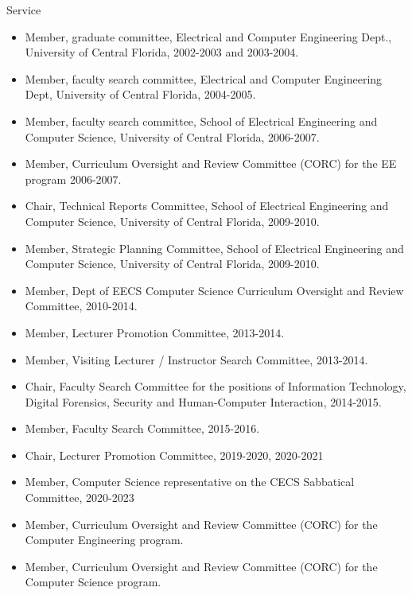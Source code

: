 \begin{category}{Service}
\begin{itemize}
\item Member, graduate committee, Electrical and Computer Engineering Dept., University of Central Florida, 2002-2003 and 2003-2004.

\item Member, faculty search committee, Electrical and Computer Engineering Dept, University of Central Florida, 2004-2005.

\item Member, faculty search committee, School of Electrical Engineering and Computer Science, University of Central Florida, 2006-2007.

\item Member, Curriculum Oversight and Review Committee (CORC) for the EE
program 2006-2007.

\item Chair, Technical Reports Committee, School of Electrical Engineering and Computer Science, University of Central Florida, 2009-2010.

\item Member, Strategic Planning Committee, School of Electrical Engineering and Computer Science, University of Central Florida, 2009-2010.

\item Member, Dept of EECS Computer Science Curriculum Oversight and Review Committee, 2010-2014.

\item Member, Lecturer Promotion Committee, 2013-2014.

\item Member, Visiting Lecturer / Instructor Search Committee, 2013-2014.

\item Chair, Faculty Search Committee for the positions of Information Technology, Digital Forensics, Security and Human-Computer Interaction, 2014-2015.

\item Member, Faculty Search Committee, 2015-2016.

\item Chair, Lecturer Promotion Committee, 2019-2020, 2020-2021

\item Member, Computer Science representative on the CECS Sabbatical Committee, 2020-2023

\item Member, Curriculum Oversight and Review Committee (CORC) for the Computer Engineering program.

\item Member, Curriculum Oversight and Review Committee (CORC) for the Computer Science program.


\end{itemize}
\end{category}
